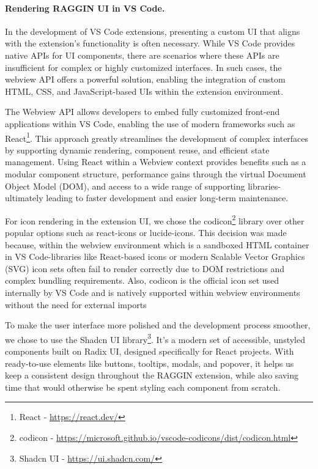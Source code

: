 \paragraph*{Rendering RAGGIN UI in VS Code.} In the development of VS Code extensions, presenting a custom UI that aligns with the extension's functionality is often necessary. While VS Code provides native APIs for UI components, there are scenarios where these APIs are insufficient for complex or highly customized interfaces. In such cases, the webview API offers a powerful solution, enabling the integration of custom HTML, CSS, and JavaScript-based UIs within the extension environment.

The Webview API allows developers to embed fully customized front-end applications within VS Code, enabling the use of modern frameworks such as React\footnote{React - \url{https://react.dev/}}. This approach greatly streamlines the development of complex interfaces by supporting dynamic rendering, component reuse, and efficient state management. Using React within a Webview context provides benefits such as a modular component structure, performance gains through the virtual Document Object Model (DOM), and access to a wide range of supporting libraries-ultimately leading to faster development and easier long-term maintenance.

For icon rendering in the extension UI, we chose the codicon\footnote{codicon - \url{https://microsoft.github.io/vscode-codicons/dist/codicon.html}} library over other popular options such as react-icons or lucide-icons. This decision was made because, within the webview environment which is a sandboxed HTML container in VS Code-libraries like React-based icons or modern Scalable Vector Graphics (SVG) icon sets often fail to render correctly due to DOM restrictions and complex bundling requirements. Also, codicon is the official icon set used internally by VS Code and is natively supported within webview environments without the need for external imports

To make the user interface more polished and the development process smoother, we chose to use the Shadcn UI library\footnote{Shadcn UI - \url{https://ui.shadcn.com/}}. It's a modern set of accessible, unstyled components built on Radix UI, designed specifically for React projects. With ready-to-use elements like buttons, tooltips, modals, and popover, it helps us keep a consistent design throughout the RAGGIN extension, while also saving time that would otherwise be spent styling each component from scratch.

